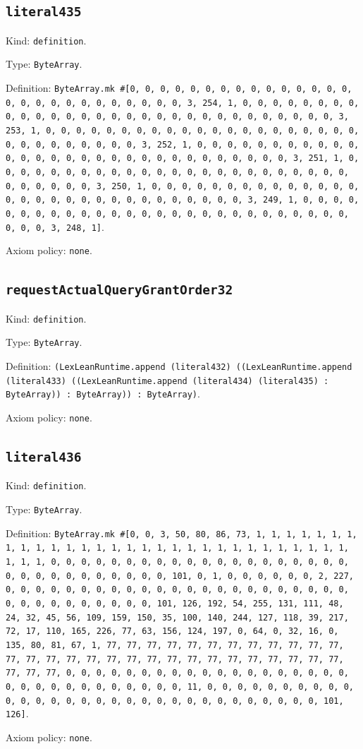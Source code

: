 \documentclass[11pt]{article}
\begin{document}
\subsection*{\texttt{literal435}}
\noindent Kind: \texttt{definition}.\par
\noindent Type: \texttt{ByteArray}.\par
\noindent Definition: \texttt{ByteArray.mk \#[0, 0, 0, 0, 0, 0, 0, 0, 0, 0, 0, 0, 0, 0, 0, 0, 0, 0, 0, 0, 0, 0, 0, 0, 0, 0, 0, 3, 254, 1, 0, 0, 0, 0, 0, 0, 0, 0, 0, 0, 0, 0, 0, 0, 0, 0, 0, 0, 0, 0, 0, 0, 0, 0, 0, 0, 0, 0, 0, 0, 3, 253, 1, 0, 0, 0, 0, 0, 0, 0, 0, 0, 0, 0, 0, 0, 0, 0, 0, 0, 0, 0, 0, 0, 0, 0, 0, 0, 0, 0, 0, 0, 0, 3, 252, 1, 0, 0, 0, 0, 0, 0, 0, 0, 0, 0, 0, 0, 0, 0, 0, 0, 0, 0, 0, 0, 0, 0, 0, 0, 0, 0, 0, 0, 0, 0, 3, 251, 1, 0, 0, 0, 0, 0, 0, 0, 0, 0, 0, 0, 0, 0, 0, 0, 0, 0, 0, 0, 0, 0, 0, 0, 0, 0, 0, 0, 0, 0, 0, 3, 250, 1, 0, 0, 0, 0, 0, 0, 0, 0, 0, 0, 0, 0, 0, 0, 0, 0, 0, 0, 0, 0, 0, 0, 0, 0, 0, 0, 0, 0, 0, 0, 3, 249, 1, 0, 0, 0, 0, 0, 0, 0, 0, 0, 0, 0, 0, 0, 0, 0, 0, 0, 0, 0, 0, 0, 0, 0, 0, 0, 0, 0, 0, 0, 0, 3, 248, 1]}.\par
\noindent Axiom policy: \texttt{none}.\par
\subsection*{\texttt{requestActualQueryGrantOrder32}}
\noindent Kind: \texttt{definition}.\par
\noindent Type: \texttt{ByteArray}.\par
\noindent Definition: \texttt{(LexLeanRuntime.append (literal432) ((LexLeanRuntime.append (literal433) ((LexLeanRuntime.append (literal434) (literal435) : ByteArray)) : ByteArray)) : ByteArray)}.\par
\noindent Axiom policy: \texttt{none}.\par
\subsection*{\texttt{literal436}}
\noindent Kind: \texttt{definition}.\par
\noindent Type: \texttt{ByteArray}.\par
\noindent Definition: \texttt{ByteArray.mk \#[0, 0, 3, 50, 80, 86, 73, 1, 1, 1, 1, 1, 1, 1, 1, 1, 1, 1, 1, 1, 1, 1, 1, 1, 1, 1, 1, 1, 1, 1, 1, 1, 1, 1, 1, 1, 1, 1, 1, 1, 0, 0, 0, 0, 0, 0, 0, 0, 0, 0, 0, 0, 0, 0, 0, 0, 0, 0, 0, 0, 0, 0, 0, 0, 0, 0, 0, 0, 0, 0, 0, 101, 0, 1, 0, 0, 0, 0, 0, 0, 2, 227, 0, 0, 0, 0, 0, 0, 0, 0, 0, 0, 0, 0, 0, 0, 0, 0, 0, 0, 0, 0, 0, 0, 0, 0, 0, 0, 0, 0, 0, 0, 0, 0, 0, 101, 126, 192, 54, 255, 131, 111, 48, 24, 32, 45, 56, 109, 159, 150, 35, 100, 140, 244, 127, 118, 39, 217, 72, 17, 110, 165, 226, 77, 63, 156, 124, 197, 0, 64, 0, 32, 16, 0, 135, 80, 81, 67, 1, 77, 77, 77, 77, 77, 77, 77, 77, 77, 77, 77, 77, 77, 77, 77, 77, 77, 77, 77, 77, 77, 77, 77, 77, 77, 77, 77, 77, 77, 77, 77, 77, 0, 0, 0, 0, 0, 0, 0, 0, 0, 0, 0, 0, 0, 0, 0, 0, 0, 0, 0, 0, 0, 0, 0, 0, 0, 0, 0, 0, 0, 0, 0, 11, 0, 0, 0, 0, 0, 0, 0, 0, 0, 0, 0, 0, 0, 0, 0, 0, 0, 0, 0, 0, 0, 0, 0, 0, 0, 0, 0, 0, 0, 0, 0, 101, 126]}.\par
\noindent Axiom policy: \texttt{none}.\par
\end{document}
